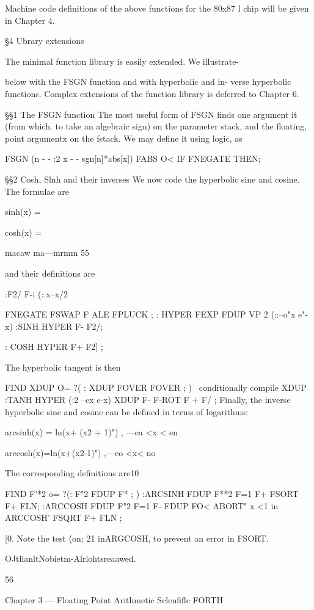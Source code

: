 Machine code definitions of the above functions for the 80x87 l
chip will be given in Chapter 4.

§4 Ubrary extensions

The minimal function library is easily extended. We illustrate-

below with the FSGN function and with hyperbolic and in-
verse hyperbolic functions. Complex extensions of the function
library is deferred to Chapter 6.

§§1 The FSGN function
The most useful form of FSGN finds one argument it (from which.
to take an algebraic sign) on the parameter stack, and the floating,
point argumentx on the fstack. We may define it using logic, as

FSGN (n - - :2 x - - sgn[n]*abs[x])
FABS O< IF FNEGATE THEN;

§§2 Cosh, Slnh and their inverses
We now code the hyperbolic sine and cosine. The formulae are

sinh(x) = %

cosh(x) = %

macaw ma—mrmm 55

and their definitions are

:F2/ F-i (::x--x/2

FNEGATE FSWAP F ALE FPLUCK ;
: HYPER FEXP FDUP VP 2 (::--o"x e"-x)
:SINH HYPER F- F2/;

: COSH HYPER F+ F2] ;

The hyperbolic tangent is then

FIND XDUP O= ?( : XDUP FOVER FOVER ; )
\ conditionally compile XDUP
:TANH HYPER (:2 --ex e-x)
XDUP F- F-ROT F + F/ ;
Finally, the inverse hyperbolic sine and cosine can be defined in
terms of logarithms:

arcsinh(x) = ln(x+ (x2 + 1)") , —ea <x < en

arccosh(x)=ln(x+(x2-1)") ,—eo <x< no

The corresponding definitions are10

FIND F'*2 o= ?(: F"2 FDUP F* ; )
:ARCSINH FDUP F**2 F=1 F+
FSORT F+ FLN;
:ARCCOSH FDUP F"2 F=1 F-
FDUP FO<
ABORT" x <1 in ARCCOSH'
FSQRT F+ FLN ;

 

[0. Note the test (on; 21 inARGCOSH, to prevent an error in FSORT.

OJtlianltNobietm-Alrlohtsreaawed.

56

Chapter 3 — Floating Point Arithmetic Sclenfiﬂc FORTH


